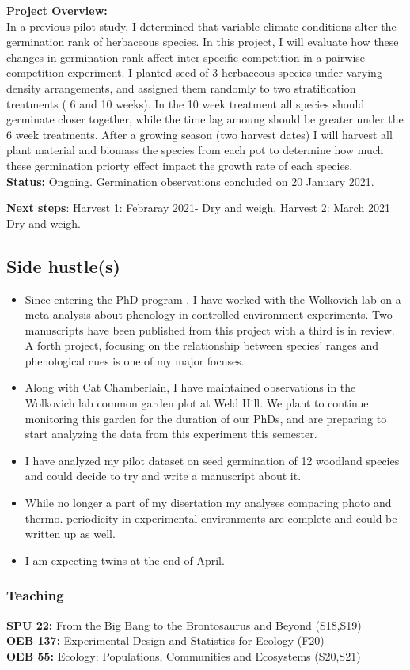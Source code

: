 \documentclass[11pt]{article}\usepackage[]{graphicx}\usepackage[]{color}
\begin{document}
\textbf{Project Overview:}\\
\indent In a previous pilot study, I determined that variable climate conditions alter the germination rank of herbaceous species. In this project, I will evaluate how these changes in germination rank affect inter-specific competition in a pairwise competition experiment.
I planted seed of 3 herbaceous species under varying density arrangements, and assigned them randomly to two stratification treatments ( 6 and 10 weeks). In the 10 week treatment all species should germinate closer together, while the time lag amoung should be greater under the 6 week treatments. After a growing season (two harvest dates) I will harvest all plant material and biomass the species from each pot to determine how much these germination priorty effect impact the growth rate of each species. \\

\textbf{Status:} Ongoing. Germination observations concluded on 20 January 2021.

\textbf{Next steps}: Harvest 1: Febraray 2021- Dry and weigh. Harvest 2: March 2021 Dry and weigh.

\textbf{}

\subsection*{Side hustle(s)}
\begin{itemize}
\item Since entering the PhD program , I have worked with the Wolkovich lab on a meta-analysis about phenology in controlled-environment experiments. Two manuscripts have been published from this project with a third is in review. A forth project, focusing on the relationship between species' ranges and phenological cues is one of my major focuses.
\item Along with Cat Chamberlain, I have maintained observations in the Wolkovich lab common garden plot at Weld Hill. We plant to continue monitoring this garden for the duration of our PhDs, and are preparing to start analyzing the data from this experiment this semester.
\item I have analyzed my pilot dataset on seed germination of 12 woodland species and could decide to try and write a manuscript about it.
\item While no longer a part of my disertation my analyses comparing  photo and thermo. periodicity in experimental environments are complete and could be written up as well.
\item I am expecting twins at the end of April.
\end{itemize}

\subsubsection*{Teaching}
\textbf{SPU 22:} From the Big Bang to the Brontosaurus and Beyond (S18,S19)\\
\textbf{OEB 137:} Experimental Design and Statistics for Ecology (F20)\\
\textbf{OEB 55:} Ecology: Populations, Communities and Ecosystems (S20,S21)\\
\end{document}
